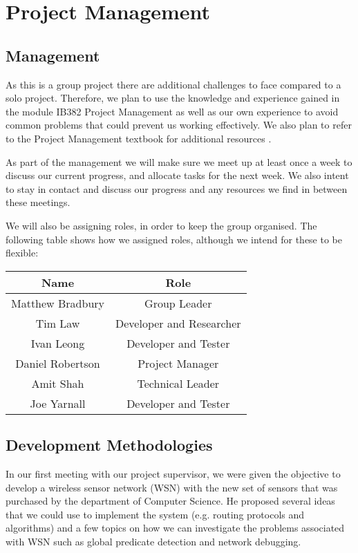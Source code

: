 \documentclass[a4paper]{article}
\begin{document}
\section{Project Management}

\subsection{Management}

As this is a group project there are additional challenges to face compared to a
solo project. Therefore, we plan to use the knowledge and experience gained in
the module IB382 Project Management \cite{IB382} as well as our own experience
to avoid common problems that could prevent us working effectively. We also plan
to refer to the Project Management textbook for additional resources
\cite{PMTextBook}.

As part of the management we will make sure we meet up at least once a week to
discuss our current progress, and allocate tasks for the next week. We also
intent to stay in contact and discuss our progress and any resources we find in
between these meetings.

We will also be assigning roles, in order to keep the group organised. The
following table shows how we assigned roles, although we intend for these to be
flexible:

\begin{table}[H]
\centering
	\begin{tabular}{| c | c |}
		\hline
		Name & Role\\
		\hline
		Matthew Bradbury & Group Leader\\
		Tim Law & Developer and Researcher\\
		Ivan Leong & Developer and Tester\\
		Daniel Robertson & Project Manager\\
		Amit Shah & Technical Leader\\
		Joe Yarnall & Developer and Tester\\
		\hline
	\end{tabular}
\end{table}



\subsection{Development Methodologies}
In our first meeting with our project supervisor, we were given the objective to
develop a wireless sensor network (WSN) with the new set of sensors that was
purchased by the department of Computer Science. He proposed several ideas that
we could use to implement the system (e.g. routing protocols and algorithms) and
a few topics on how we can investigate the problems associated with WSN such as
global predicate detection and network debugging. 
\end{document}
